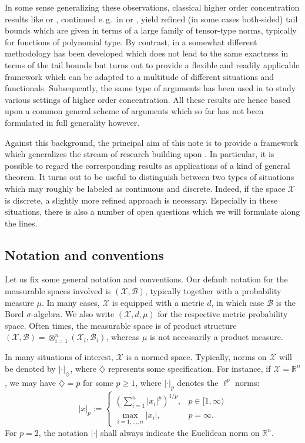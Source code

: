 \documentclass[a4paper,12pt]{amsart}
\numberwithin{equation}{section}
\theoremstyle{remark}
\def\R{{\mathbb R}}
\begin{document}
In some sense generalizing these observations, classical higher order concentration results like \cite{Lat06} or \cite{AW15}, continued e.\,g.\ in \cite{ABW17} or \cite{GSS21b}, yield refined (in some cases both-sided) tail bounds which are given in terms of a large family of tensor-type norms, typically for functions of polynomial type. By contrast, in \cite{BGS19} a somewhat different methodology has been developed which does not lead to the same exactness in terms of the tail bounds but turns out to provide a flexible and readily applicable framework which can be adapted to a multitude of different situations and functionals. Subsequently, the same type of arguments has been used in \cite{GSS19,GSS21a,GS23,GS24} to study various settings of higher order concentration. All these results are hence based upon a common general scheme of arguments which so far has not been formulated in full generality however.

Against this background, the principal aim of this note is to provide a framework which generalizes the stream of research building upon \cite{BGS19}. In particular, it is possible to regard the corresponding results as applications of a kind of general theorem. It turns out to be useful to distinguish between two types of situations which may roughly be labeled as continuous and discrete. Indeed, if the space $\mathcal{X}$ is discrete, a slightly more refined approach is necessary. Especially in these situations, there is also a number of open questions which we will formulate along the lines.

\subsection{Notation and conventions}

Let us fix some general notation and conventions. Our default notation for the measurable spaces involved is $(\mathcal{X}, \mathcal{B})$, typically together with a probability measure $\mu$. In many cases, $\mathcal{X}$ is equipped with a metric $d$, in which case $\mathcal{B}$ is the Borel $\sigma$-algebra. We also write $(\mathcal{X},d,\mu)$ for the respective metric probability space. Often times, the measurable space is of product structure $(\mathcal{X}, \mathcal{B}) = \otimes_{i = 1}^n (\mathcal{X}_i, \mathcal{B}_i)$, whereas $\mu$ is not necessarily a product measure.

In many situations of interest, $\mathcal{X}$ is a normed space. Typically, norms on $\mathcal{X}$ will be denoted by $\lvert \cdot \rvert_\diamondsuit$, where $\diamondsuit$ represents some specification. For instance, if $\mathcal{X} = \R^n$, we may have $\diamondsuit = p$ for some $p \ge 1$, where $\lvert \cdot \rvert_p$ denotes the $\ell^p$ norms:
\[
\lvert x \rvert_p := \begin{cases}
(\sum_{i=1}^n |x_i|^p)^{1/p}, & p \in [1, \infty)\\
\max_{i = 1,\ldots, n} |x_i|, & p = \infty.
\end{cases}
\]
For $p=2$, the notation $\lvert \cdot \rvert$ shall always indicate the Euclidean norm on $\R^n$.
\end{document}
